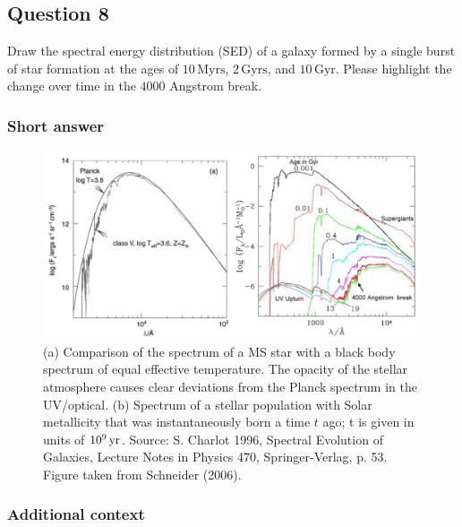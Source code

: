 \documentclass[a4paper,10pt]{article}
\begin{document}

\newpage
\subsection{Question 8}

Draw the spectral energy distribution (SED) of a galaxy formed by a single burst of star formation at the ages of $10\,\mathrm{Myrs}$, $2\,\mathrm{Gyrs}$, and $10\,\mathrm{Gyr}$. Please highlight the change over time in the $4000$ Angstrom break.

\subsubsection{Short answer}

\begin{figure}[h]
    \includegraphics[width=16cm]{figures/SED_SF.png}
    \centering
    \caption{\footnotesize{(a) Comparison of the spectrum of a MS star with a black body spectrum of equal effective temperature. The opacity of the stellar atmosphere causes clear deviations from the Planck spectrum in the UV/optical. (b) Spectrum of a stellar population with Solar metallicity that was instantaneously born a time $t$ ago; t is given in units of $10^9\,{\rm yr}$. Source: S. Charlot 1996, Spectral Evolution of Galaxies, Lecture Notes in Physics 470, Springer-Verlag, p. 53. Figure taken from Schneider (2006).}}
    \label{fig:sedsf}
\end{figure}

\subsubsection{Additional context}
\end{document}
